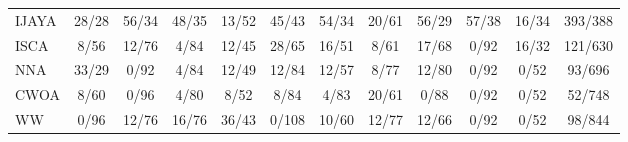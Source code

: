 \documentclass[a4paper,fleqn]{cas-dc}
\begin{document}
\begin{table}[<options>]
\begin{tabular*}{\tblwidth}{@{}LCCCCCCCCCCC@{}}
IJAYA &  28/28 &  56/34 &  48/35 & 13/52  & 45/43 &  54/34 &  20/61 & 56/29  & 57/38  & 16/34  & 393/388\\
ISCA & 8/56  & 12/76  & 4/84  & 12/45  & 28/65  & 16/51  & 8/61  & 17/68  & 0/92  & 16/32  & 121/630\\
NNA & 33/29  & 0/92  & 4/84  & 12/49  & 12/84  & 12/57  & 8/77  & 12/80  & 0/92& 0/52  & 93/696\\
CWOA & 8/60  & 0/96  &  4/80& 8/52  & 8/84& 4/83  & 20/61  & 0/88  & 0/92 & 0/52  & 52/748\\
WW & 0/96  & 12/76  & 16/76&  36/43 & 0/108 & 10/60 & 12/77  & 12/66  & 0/92& 0/52  & 98/844\\
\bottomrule
\end{tabular*}
\end{table}


\end{document}
